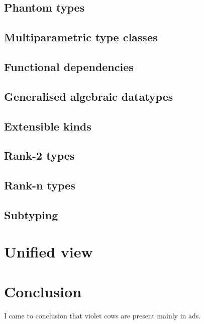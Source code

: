 \documentclass[11pt,oneside,draft]{fithesis2}
\begin{document}
\section{Phantom types}

\section{Multiparametric type classes}

\section{Functional dependencies}

\section{Generalised algebraic datatypes}

\section{Extensible kinds}

\section{Rank-2 types}

\section{Rank-n types}

\section{Subtyping}

\chapter{Unified view}


\chapter{Conclusion}

I came to conclusion that violet cows are present mainly in ads.



\end{document}
